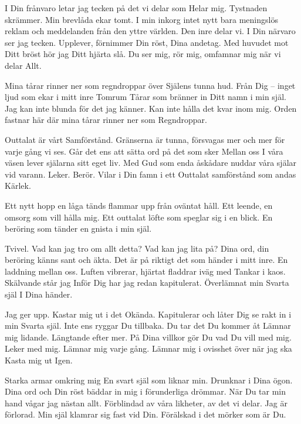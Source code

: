 \startpoem
I Din frånvaro
letar jag tecken på det vi delar som
Helar mig.
Tystnaden skrämmer.
Min brevlåda ekar tomt.
I min inkorg intet nytt
bara meningslös reklam och meddelanden från
den yttre världen.
Den inre delar vi.
I Din närvaro ser jag tecken.
Upplever, förnimmer
Din röst, Dina andetag.
Med huvudet mot Ditt bröst hör jag
Ditt hjärta slå.
Du ser mig, rör mig,
omfamnar mig när vi delar
Allt.
\stoppoem

\startpoem
Mina tårar rinner ner
som regndroppar över
Själens tunna hud.
Från Dig – inget ljud
som ekar i mitt inre
Tomrum
Tårar som bränner in
Ditt namn i min själ.
Jag kan inte blunda 
för det jag känner.
Kan inte hålla det kvar inom mig.
Orden fastnar här
där mina tårar rinner ner som
Regndroppar.
\stoppoem

\startpoem
Outtalat är vårt
Samförstånd.
Gränserna är tunna,
försvagas mer och mer 
för varje gång vi ses. 
Går det ens att sätta ord på det som sker
Mellan oss
I våra väsen lever själarna sitt eget liv.
Med Gud som enda åskådare
nuddar våra själar vid varann.
Leker.
Berör.
Vilar i Din famn i ett
Outtalat samförstånd 
som andas
Kärlek.
\stoppoem

\startpoem
Ett nytt hopp
en låga tänds
flammar upp
från oväntat håll.
Ett leende, en omsorg
som vill hålla mig.
Ett outtalat löfte
som speglar sig i en blick.
En beröring som tänder
en gnista i 
min själ.
\stoppoem

\startpoem
Tvivel.
Vad kan jag tro om allt detta?
Vad kan jag lita på?
Dina ord, din beröring
känns sant och äkta.
Det är på riktigt det som händer 
i mitt inre.
En laddning mellan oss.
Luften vibrerar, hjärtat fladdrar iväg med
Tankar i kaos.
Skälvande står jag
Inför Dig 
har jag redan kapitulerat.
Överlämnat min
Svarta själ
I Dina händer.
\stoppoem

\startpoem
Jag ger upp.
Kastar mig ut i det
Okända.
Kapitulerar och låter Dig se rakt in i min
Svarta själ.
Inte ens ryggar Du tillbaka.
Du tar det Du kommer åt
Lämnar mig lidande.
Längtande efter mer.
På Dina villkor gör Du vad Du vill med mig.
Leker med mig.
Lämnar mig varje gång.
Lämnar mig i ovisshet över när jag ska
Kasta mig ut 
Igen.
\stoppoem

\startpoem
Starka armar
omkring mig 
En svart själ som liknar min.
Drunknar i Dina ögon.
Dina ord och Din röst
bäddar in mig i 
förunderliga drömmar.
När Du tar min hand vågar jag
nästan allt.
Förblindad av våra likheter,
av det vi delar.
Jag är förlorad.
Min själ klamrar sig fast vid Din.
Förälskad i det mörker 
som är Du.
\stoppoem

